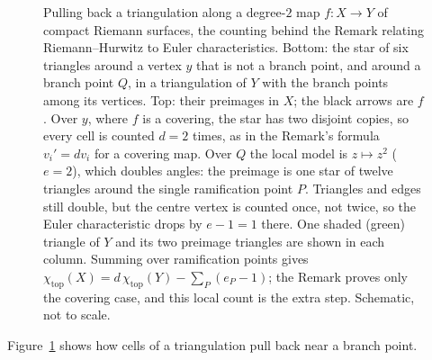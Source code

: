 \documentclass[12pt]{article}
\numberwithin{equation}{section}
\theoremstyle{definition}
\theoremstyle{remark}
\renewcommand{\top}{\operatorname{top}}
\renewcommand{\top}{\operatorname{top}}
\begin{document}
\begin{figure}[H]
\centering

\caption{Pulling back a triangulation along a degree-$2$ map $f:X\to Y$ of compact Riemann surfaces, the counting behind the Remark relating Riemann--Hurwitz to Euler characteristics. Bottom: the star of six triangles around a vertex $y$ that is not a branch point, and around a branch point $Q$, in a triangulation of $Y$ with the branch points among its vertices. Top: their preimages in $X$; the black arrows are $f$. Over $y$, where $f$ is a covering, the star has two disjoint copies, so every cell is counted $d=2$ times, as in the Remark's formula $v_i'=dv_i$ for a covering map. Over $Q$ the local model is $z\mapsto z^2$ ($e=2$), which doubles angles: the preimage is one star of twelve triangles around the single ramification point $P$. Triangles and edges still double, but the centre vertex is counted once, not twice, so the Euler characteristic drops by $e-1=1$ there. One shaded (green) triangle of $Y$ and its two preimage triangles are shown in each column. Summing over ramification points gives $\chi_{\top}(X)=d\,\chi_{\top}(Y)-\sum_P(e_P-1)$; the Remark proves only the covering case, and this local count is the extra step. Schematic, not to scale.}\label{fig:riemann-hurwitz-triangulation}
\end{figure}
Figure~\ref{fig:riemann-hurwitz-triangulation} shows how cells of a triangulation pull back near a branch point.
\end{document}
